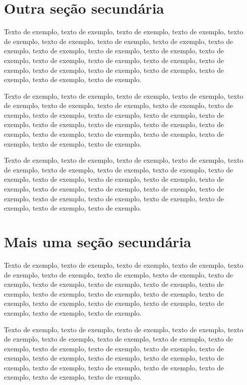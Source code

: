 \documentclass[
	12pt,				%
	oneside,			%
	a4paper,			%
	english,			%
	brazil				%
	]{abntex2ppgsi}
\begin{document}
\section{Outra seção secundária}

Texto de exemplo, texto de exemplo, texto de exemplo, texto de exemplo, texto de exemplo, texto de exemplo, texto de exemplo, texto de exemplo, texto de exemplo, texto de exemplo, texto de exemplo, texto de exemplo, texto de exemplo, texto de exemplo, texto de exemplo, texto de exemplo, texto de exemplo, texto de exemplo, texto de exemplo, texto de exemplo, texto de exemplo, texto de exemplo, texto de exemplo.

Texto de exemplo, texto de exemplo, texto de exemplo, texto de exemplo, texto de exemplo, texto de exemplo, texto de exemplo, texto de exemplo, texto de exemplo, texto de exemplo, texto de exemplo, texto de exemplo, texto de exemplo, texto de exemplo, texto de exemplo, texto de exemplo, texto de exemplo, texto de exemplo, texto de exemplo, texto de exemplo, texto de exemplo, texto de exemplo, texto de exemplo.

Texto de exemplo, texto de exemplo, texto de exemplo, texto de exemplo, texto de exemplo, texto de exemplo, texto de exemplo, texto de exemplo, texto de exemplo, texto de exemplo, texto de exemplo, texto de exemplo, texto de exemplo, texto de exemplo, texto de exemplo, texto de exemplo, texto de exemplo, texto de exemplo, texto de exemplo, texto de exemplo, texto de exemplo, texto de exemplo, texto de exemplo.

\section{Mais uma seção secundária}

Texto de exemplo, texto de exemplo, texto de exemplo, texto de exemplo, texto de exemplo, texto de exemplo, texto de exemplo, texto de exemplo, texto de exemplo, texto de exemplo, texto de exemplo, texto de exemplo, texto de exemplo, texto de exemplo, texto de exemplo, texto de exemplo, texto de exemplo, texto de exemplo, texto de exemplo, texto de exemplo, texto de exemplo, texto de exemplo, texto de exemplo.

Texto de exemplo, texto de exemplo, texto de exemplo, texto de exemplo, texto de exemplo, texto de exemplo, texto de exemplo, texto de exemplo, texto de exemplo, texto de exemplo, texto de exemplo, texto de exemplo, texto de exemplo, texto de exemplo, texto de exemplo, texto de exemplo, texto de exemplo, texto de exemplo, texto de exemplo, texto de exemplo, texto de exemplo, texto de exemplo, texto de exemplo.
\end{document}
